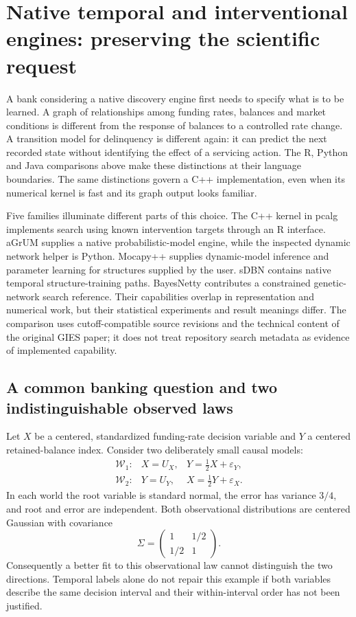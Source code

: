 \section{Native temporal and interventional engines: preserving the scientific request}
\label{exec16:cxx-temporal}

A bank considering a native discovery engine first needs to specify what is
to be learned. A graph of relationships among funding rates, balances and
market conditions is different from the response of balances to a controlled
rate change. A transition model for delinquency is different again: it can
predict the next recorded state without identifying the effect of a servicing
action. The R, Python and Java comparisons above make these distinctions at
their language boundaries. The same distinctions govern a C++ implementation,
even when its numerical kernel is fast and its graph output looks familiar.

Five families illuminate different parts of this choice. The C++ kernel in
pcalg implements search using known intervention targets through an R interface.
aGrUM supplies a native probabilistic-model engine, while the inspected dynamic
network helper is Python. Mocapy++ supplies dynamic-model inference and parameter
learning for structures supplied by the user. sDBN contains native temporal
structure-training paths. BayesNetty contributes a constrained genetic-network
search reference. Their capabilities overlap in representation and numerical
work, but their statistical experiments and result meanings differ.
The comparison uses cutoff-compatible source revisions and the technical
content of the original GIES paper; it does not treat repository search
metadata as evidence of implemented capability.\citep{exec16_ct_pcalg,exec16_ct_agrum,exec16_ct_mocapy,exec16_ct_sdbn,exec16_ct_bayesnetty,exec14_pt_paper_gies}

\subsection{A common banking question and two indistinguishable observed laws}

Let $X$ be a centered, standardized funding-rate decision variable and $Y$ a
centered retained-balance index. Consider two deliberately small causal models:
\[
 \begin{array}{lll}
 \mathcal W_1:&X=U_X,&Y=\tfrac12X+\varepsilon_Y,\\
 \mathcal W_2:&Y=U_Y,&X=\tfrac12Y+\varepsilon_X.
 \end{array}
\]
In each world the root variable is standard normal, the error has variance
$3/4$, and root and error are independent. Both observational distributions
are centered Gaussian with covariance
\[
 \Sigma=\begin{pmatrix}1&1/2\\1/2&1\end{pmatrix}.
\]
Consequently a better fit to this observational law cannot distinguish the
two directions. Temporal labels alone do not repair this example if both
variables describe the same decision interval and their within-interval order
has not been justified.

